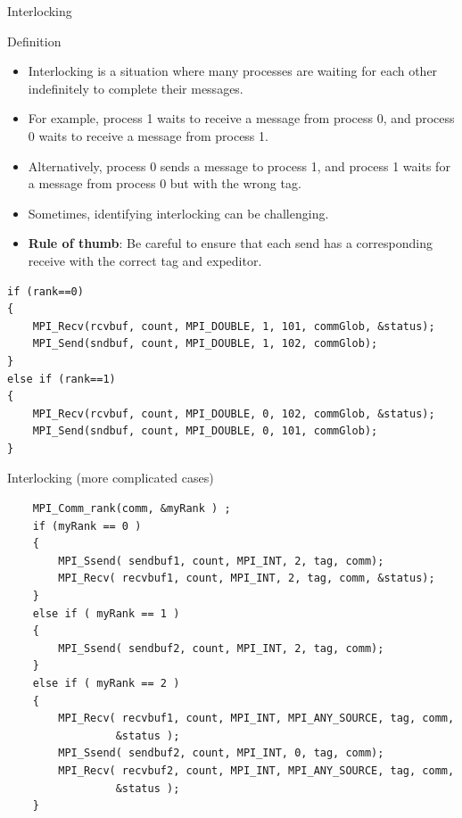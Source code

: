 \documentclass[compress,10pt,aspectratio=169]{beamer}
\begin{document}
\begin{frame}[fragile]{Interlocking}
    \scriptsize
    \begin{block}{Definition}
        \begin{itemize}
            \item Interlocking is a situation where many processes are waiting for each other indefinitely to complete their messages.
            \item For example, process 1 waits to receive a message from process 0, and process 0 waits to receive a message from process 1.
            \item Alternatively, process 0 sends a message to process 1, and process 1 waits for a message from process 0 but with the wrong tag.
            \item Sometimes, identifying interlocking can be challenging.
            \item \textbf{Rule of thumb}: Be careful to ensure that each send has a corresponding receive with the correct tag and expeditor.
        \end{itemize}
    \end{block}

\begin{verbatim}
if (rank==0)
{
    MPI_Recv(rcvbuf, count, MPI_DOUBLE, 1, 101, commGlob, &status);
    MPI_Send(sndbuf, count, MPI_DOUBLE, 1, 102, commGlob);
}
else if (rank==1)
{
    MPI_Recv(rcvbuf, count, MPI_DOUBLE, 0, 102, commGlob, &status);
    MPI_Send(sndbuf, count, MPI_DOUBLE, 0, 101, commGlob);
}
\end{verbatim}
\end{frame}

\begin{frame}[fragile]{Interlocking (more complicated cases)}

    \begin{verbatim}
    MPI_Comm_rank(comm, &myRank ) ;
    if (myRank == 0 ) 
    {
        MPI_Ssend( sendbuf1, count, MPI_INT, 2, tag, comm);
        MPI_Recv( recvbuf1, count, MPI_INT, 2, tag, comm, &status);
    } 
    else if ( myRank == 1 ) 
    {
        MPI_Ssend( sendbuf2, count, MPI_INT, 2, tag, comm);
    }
    else if ( myRank == 2 ) 
    {
        MPI_Recv( recvbuf1, count, MPI_INT, MPI_ANY_SOURCE, tag, comm,
                 &status );
        MPI_Ssend( sendbuf2, count, MPI_INT, 0, tag, comm);
        MPI_Recv( recvbuf2, count, MPI_INT, MPI_ANY_SOURCE, tag, comm,
                 &status );
    }    
    \end{verbatim}
    \end{frame}
    
\end{document}
